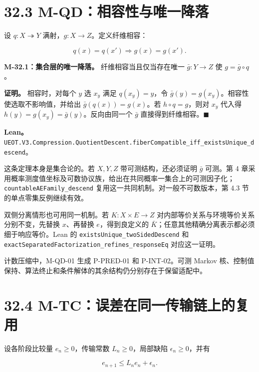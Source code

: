 \documentclass[
  11pt,
  oneside]{book}
\begin{document}
\section{32.3 M-QD：相容性与唯一降落}\label{m-qdux76f8ux5bb9ux6027ux4e0eux552fux4e00ux964dux843d}

设 \(q:X\twoheadrightarrow Y\) 满射，\(g:X\to Z\)。定义纤维相容：

\[q(x)=q(x')\Longrightarrow g(x)=g(x').\]

\hypertarget{m-32-1}{}\label{m-32-1}

\textbf{M-32.1：集合层的唯一降落。} 纤维相容当且仅当存在唯一 \(\bar g:Y\to Z\) 使 \(g=\bar g\circ q\)。

\textbf{证明。} 相容时，对每个 \(y\) 选 \(x_y\) 满足 \(q(x_y)=y\)，令 \(\bar g(y)=g(x_y)\)。相容性使选取不影响值，并给出 \(\bar g(q(x))=g(x)\)。若 \(h\circ q=g\)，则对 \(x_y\) 代入得 \(h(y)=g(x_y)=\bar g(y)\)。反向由同一个 \(\bar g\) 直接得到纤维相容。\(\blacksquare\)

\textbf{Lean。} \nolinkurl{UEOT.V3.Compression.QuotientDescent.fiberCompatible_iff_existsUnique_descend}。

这条定理本身是集合论的。若 \(X,Y,Z\) 带可测结构，还必须证明 \(\bar g\) 可测。第 4 章采用概率测度值坐标及可数协议族，给出在共同概率一集合上的可测因子化；\nolinkurl{countableAEFamily_descend} 复用这一共同机制。对一般不可数版本，第 4.3 节的单点零集反例继续有效。

双侧分离情形也可用同一机制。若 \(K:X\times E\to Z\) 对内部等价关系与环境等价关系分别不变，先替换 \(x\)、再替换 \(e\)，得到良定义的 \(\bar K\)；任意其他精确分离表示都必须细于响应等价。Lean 的 \nolinkurl{existsUnique_twoSidedDescend} 和 \nolinkurl{exactSeparatedFactorization_refines_responseEq} 对应这一证明。

计数压缩中，M-QD-01 生成 P-PRED-01 和 P-INT-02。可测 Markov 核、控制值保持、算法终止和条件解体的其余结构仍分别存在于保留适配中。

\section{32.4 M-TC：误差在同一传输链上的复用}\label{m-tcux8befux5deeux5728ux540cux4e00ux4f20ux8f93ux94feux4e0aux7684ux590dux7528}

设各阶段比较量 \(e_n\ge0\)，传输常数 \(L_n\ge0\)，局部缺陷 \(\epsilon_n\ge0\)，并有

\[e_{n+1}\le L_ne_n+\epsilon_n.\]

\hypertarget{m-32-2}{}\label{m-32-2}
\end{document}
